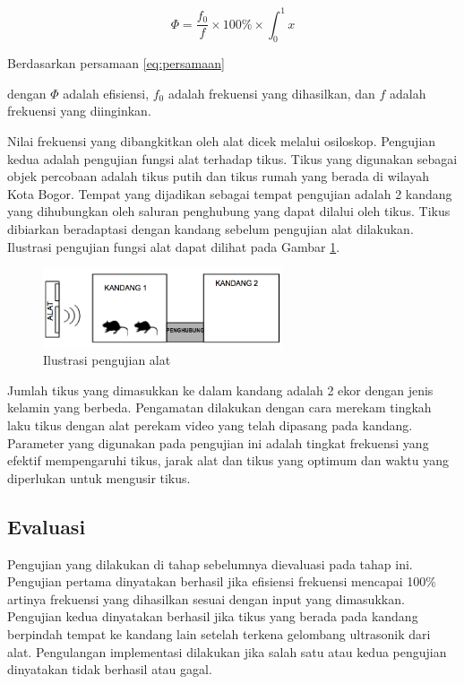 \begin{equation}
\Phi = \frac{f_0}{f}\times 100\% \times \int_0^1x
\label{eq:persamaan}
\end{equation}

Berdasarkan persamaan \ref{eq:persamaan}

\noindent dengan $\Phi$ adalah efisiensi, $f_0$ adalah frekuensi yang dihasilkan, dan $f$ adalah frekuensi yang diinginkan.

Nilai frekuensi yang dibangkitkan oleh alat dicek melalui osiloskop. Pengujian kedua adalah pengujian fungsi alat terhadap tikus. Tikus yang digunakan sebagai objek percobaan adalah tikus putih dan tikus rumah yang berada di wilayah Kota Bogor. Tempat yang dijadikan sebagai tempat pengujian adalah 2 kandang yang dihubungkan oleh saluran penghubung yang dapat dilalui oleh tikus. Tikus dibiarkan beradaptasi dengan kandang sebelum pengujian alat dilakukan. Ilustrasi pengujian fungsi alat dapat dilihat pada Gambar \ref{fig:pengujian}.

\begin{figure}[h!]\centering %
\includegraphics[width=200pt]{kolokium_contoh_gb4.png}
\caption{Ilustrasi pengujian alat}
\label{fig:pengujian}
\end{figure}

Jumlah tikus yang dimasukkan ke dalam kandang adalah 2 ekor dengan jenis kelamin yang berbeda. Pengamatan dilakukan dengan cara merekam tingkah laku tikus dengan alat perekam video yang telah dipasang pada kandang. Parameter yang digunakan pada pengujian ini adalah tingkat frekuensi yang efektif mempengaruhi tikus, jarak alat dan tikus yang optimum dan waktu yang diperlukan untuk mengusir tikus.

\subsection*{Evaluasi}
Pengujian yang dilakukan di tahap sebelumnya dievaluasi pada tahap ini. Pengujian pertama dinyatakan berhasil jika efisiensi frekuensi mencapai 100$\%$ artinya frekuensi yang dihasilkan sesuai dengan input yang dimasukkan. Pengujian kedua dinyatakan berhasil jika tikus yang berada pada kandang berpindah tempat ke kandang lain setelah terkena gelombang ultrasonik dari alat. Pengulangan implementasi dilakukan jika salah satu atau kedua pengujian dinyatakan tidak berhasil atau gagal.

